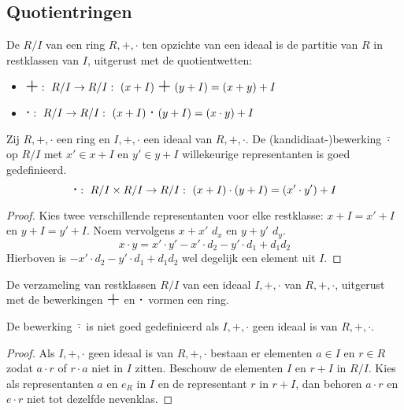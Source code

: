 \documentclass[main.tex]{subfiles}
\begin{document}
\subsection{Quotientringen}
\label{sec:quotientringen}

\begin{de}
  De  $R/I$ van een ring $R,+,\cdot$ ten opzichte van een ideaal is de partitie van $R$ in restklassen van $I$, uitgerust met de quotientwetten:
  \begin{itemize}
  \item $\scalebox{1.5}{$+$}:\ R/I \rightarrow R/I:\ (x+I)\ \scalebox{1.5}{$+$}\ (y+I) = (x+y)+I$
  \item $\scalebox{1.5}{$\cdot$}:\ R/I \rightarrow R/I:\ (x+I)\ \scalebox{1.5}{$\cdot$}\ (y+I) = (x\cdot y) + I$
  \end{itemize}
\end{de}

\begin{pr}
  Zij $R,+,\cdot$ een ring en $I,+,\cdot$ een ideaal van $R,+,\cdot$.
  De (kandidiaat-)bewerking $\bar{\cdot}$ op $R/I$ met $x'\in x+I$ en $y'\in y+I$ willekeurige representanten is goed gedefinieerd.
  \[ \scalebox{1.5}{$\cdot$}:\ R/I \times R/I \rightarrow R/I:\ (x+I) \cdot (y+I) = (x'\cdot y') + I \]

  \begin{proof}
    Kies twee verschillende representanten voor elke restklasse: $x+I = x'+I$ en $y+I = y'+I$.
    Noem vervolgens $x+x'$ $d_{x}$ en $y+y'$ $d_{y}$.
    \[ x\cdot y = x'\cdot y' - x'\cdot d_{2} - y'\cdot d_{1} + d_{1}d_{2} \]
    Hierboven is $ - x'\cdot d_{2} - y'\cdot d_{1} + d_{1}d_{2}$ wel degelijk een element uit $I$.
  \end{proof}
\end{pr}

\begin{st}
  De verzameling van restklassen $R/I$ van een ideaal $I,+,\cdot$ van $R,+,\cdot$, uitgerust met de bewerkingen $\scalebox{1.5}{$+$}$ en $\scalebox{1.5}{$\cdot$}$ vormen een ring.
\end{st}

\begin{opm}
  De bewerking $\bar{\cdot}$ is niet goed gedefinieerd als $I,+,\cdot$ geen ideaal is van $R,+,\cdot$.

  \begin{proof}
    Als $I,+,\cdot$ geen ideaal is van $R,+,\cdot$ bestaan er elementen $a\in I$ en $r\in R$ zodat $a\cdot r$ of $r\cdot a$ niet in $I$ zitten.
    Beschouw de elementen $I$ en $r+I$ in $R/I$.
    Kies als representanten $a$ en $e_{R}$ in $I$ en de representant $r$ in $r+I$, dan behoren $a\cdot r$ en $e\cdot r$ niet tot dezelfde nevenklas.
  \end{proof}
\end{opm}
\end{document}
